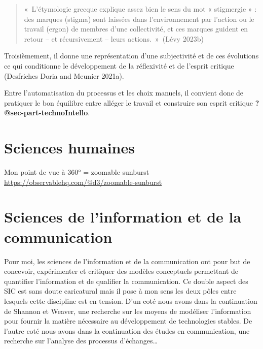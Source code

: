 \documentclass[
  letterpaper,
  DIV=11,
  numbers=noendperiod]{scrreprt}
\begin{document}
\begin{quote}
«~L'étymologie grecque explique assez bien le sens du mot « stigmergie »
: des marques (stigma) sont laissées dans l'environnement par l'action
ou le travail (ergon) de membres d'une collectivité, et ces marques
guident en retour -- et récursivement -- leurs actions.~»~(Lévy 2023b)
\end{quote}

Troisièmement, il donne une représentation d'une subjectivité et de ces
évolutions ce qui conditionne le développement de la réflexivité et de
l'esprit critique (Desfriches Doria and Meunier 2021a).

Entre l'automatisation du processus et les choix manuels, il convient
donc de pratiquer le bon équilibre entre alléger le travail et
construire son esprit critique \textbf{?@sec-part-technoIntello}.

\hypertarget{sec-posiSciencesHumaines}{%
\section{Sciences humaines}\label{sec-posiSciencesHumaines}}

Mon point de vue à 360° = zoomable sunburst
\url{https://observablehq.com/@d3/zoomable-sunburst}

\hypertarget{sec-posiSIC}{%
\section{Sciences de l'information et de la
communication}\label{sec-posiSIC}}

Pour moi, les sciences de l'information et de la communication ont pour
but de concevoir, expérimenter et critiquer des modèles conceptuels
permettant de quantifier l'information et de qualifier la communication.
Ce double aspect des SIC est sans doute caricatural mais il pose à mon
sens les deux pôles entre lesquels cette discipline est en tension. D'un
coté nous avons dans la continuation de Shannon et Weaver, une recherche
sur les moyens de modéliser l'information pour fournir la matière
nécessaire au développement de technologies stables. De l'autre coté
nous avons dans la continuation des études en communication, une
recherche sur l'analyse des processus d'échanges\ldots{}
\end{document}
